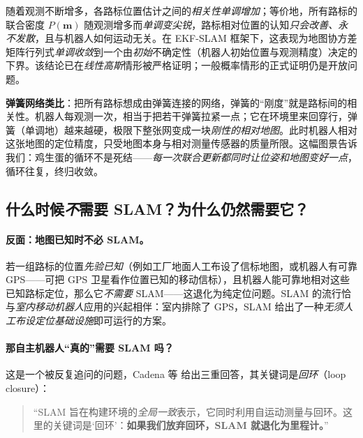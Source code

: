 \begin{theorem}\label{thm:intro-convergence}
随着观测不断增多，各路标位置估计之间的\emph{相关性单调增加}；等价地，所有路标的联合密度 $P(\mathbf{m})$ 随观测增多而\emph{单调变尖锐}，路标相对位置的认知\emph{只会改善、永不发散}，且与机器人如何运动无关。在 EKF-SLAM 框架下，这表现为地图协方差矩阵行列式\emph{单调收敛}到一个由\emph{初始}不确定性（机器人初始位置与观测精度）决定的下界。该结论已在\emph{线性高斯}情形被严格证明；一般概率情形的正式证明仍是开放问题\cite{durrantwhyte2006slam}。
\end{theorem}

\begin{insight}
\textbf{弹簧网络类比}\cite{durrantwhyte2006slam}：把所有路标想成由弹簧连接的网络，弹簧的“刚度”就是路标间的相关性。机器人每观测一次，相当于把若干弹簧拉紧一点；它在环境里来回穿行，弹簧（单调地）越来越硬，极限下整张网变成一块\emph{刚性的相对地图}。此时机器人相对这张地图的定位精度，只受地图本身与相对测量传感器的质量所限。这幅图景告诉我们：鸡生蛋的循环不是死结——\emph{每一次联合更新都同时让位姿和地图变好一点}，循环往复，终归收敛。
\end{insight}

\subsection{什么时候\texorpdfstring{\emph{不}}{不}需要 SLAM？为什么仍然需要它？}
\label{sec:intro-need}

\paragraph{反面：地图已知时不必 SLAM。}
若一组路标的位置\emph{先验已知}（例如工厂地面人工布设了信标地图，或机器人有可靠 GPS——可把 GPS 卫星看作位置已知的移动信标），且机器人能可靠地相对这些已知路标定位，那么它\emph{不需要} SLAM——这退化为纯定位问题\cite{cadena2016past}。SLAM 的流行恰与\emph{室内移动机器人}应用的兴起相伴：室内排除了 GPS，SLAM 给出了一种\emph{无须人工布设定位基础设施}即可运行的方案。

\paragraph{那自主机器人“真的”需要 SLAM 吗？}
这是一个被反复追问的问题，Cadena 等\cite{cadena2016past} 给出三重回答，其关键词是\emph{回环}（loop closure）：

\begin{quote}
“SLAM 旨在构建环境的\emph{全局一致}表示，它同时利用自运动测量与回环。这里的关键词是‘回环’：\textbf{如果我们放弃回环，SLAM 就退化为里程计。}”\cite{cadena2016past}
\end{quote}

